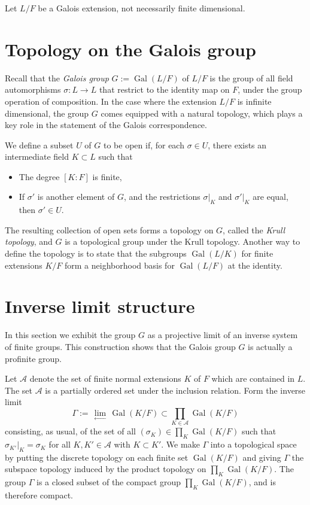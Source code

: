 \documentclass[12pt]{article}
\newcommand{\A}{\mathcal{A}}
\newcommand{\lra}{\longrightarrow}
\newcommand{\Gal}{\operatorname{Gal}}
\newcommand{\ilim}{\,\underset{\longleftarrow}{\lim}\,}
\theoremstyle{definition}
\begin{document}
Let $L/F$ be a Galois extension, not necessarily finite dimensional.

\section{Topology on the Galois group}

Recall that the \emph{Galois group} $G := \Gal(L/F)$ of $L/F$ is the
group of all field automorphisms $\sigma: L \lra L$ that restrict to
the identity map on $F$, under the group operation of composition. In
the case where the extension $L/F$ is infinite dimensional, the group
$G$ comes equipped with a natural topology, which plays a key role in
the statement of the Galois correspondence.

We define a subset $U$ of $G$ to be open if, for each $\sigma \in U$,
there exists an intermediate field $K \subset L$ such that
\begin{itemize}
\item The degree $[K:F]$ is finite,
\item If $\sigma'$ is another element of $G$, and the restrictions
  $\sigma|_K$ and $\sigma'|_K$ are equal, then $\sigma' \in U$.
\end{itemize}

The resulting collection of open sets forms a topology on $G$, called
the \emph{Krull topology}, and $G$ is a topological group under the
Krull topology.  Another way to define the topology is to state that
the subgroups $\Gal(L/K)$ for finite extensions $K/F$ form a neighborhood
basis for $\Gal(L/F)$ at the identity.

\section{Inverse limit structure}

In this section we exhibit the group $G$ as a projective limit of an
inverse system of finite groups. This construction shows that the
Galois group $G$ is actually a profinite group.

Let $\A$ denote the set of finite normal extensions $K$ of $F$ which
are contained in $L$. The set $\A$ is a partially ordered set under
the inclusion relation. Form the inverse limit
$$
\Gamma := \ilim \Gal(K/F) \subset \prod_{K \in \A} \Gal(K/F)
$$
consisting, as usual, of the set of all $(\sigma_K) \in \prod_K
\Gal(K/F)$ such that $\sigma_{K'}|_K = \sigma_K$ for all $K,K' \in \A$
with $K \subset K'$. We make $\Gamma$ into a topological space by
putting the discrete topology on each finite set $\Gal(K/F)$ and
giving $\Gamma$ the subspace topology induced by the product topology
on $\prod_K \Gal(K/F)$. The group $\Gamma$ is a closed subset of the
compact group $\prod_K \Gal(K/F)$, and is therefore compact.
\end{document}
